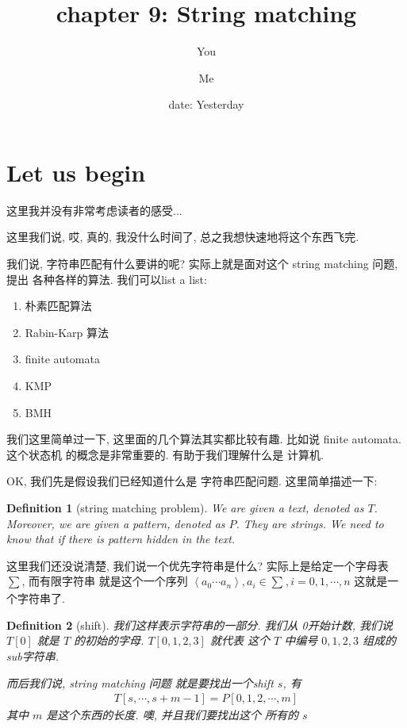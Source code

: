 \documentclass[a4paper, 10pt]{ctexart} %
\title{chapter 9: String matching}
\author{You \and Me}
\date{date: Yesterday}
\newtheorem{definition}{Definition}
\begin{document}
\maketitle
\tableofcontents
\newpage

\section{Let us begin}
这里我并没有非常考虑读者的感受...

这里我们说, 哎, 真的, 我没什么时间了, 
总之我想快速地将这个东西飞完. 

我们说, 字符串匹配有什么要讲的呢? 
实际上就是面对这个 string matching 问题, 提出
各种各样的算法.
我们可以list a list: 
\begin{enumerate}
    \item 朴素匹配算法
    \item Rabin-Karp 算法
    \item finite automata 
    \item KMP 
    \item BMH
\end{enumerate}

我们这里简单过一下, 
这里面的几个算法其实都比较有趣.
比如说 finite automata. 这个状态机
的概念是非常重要的. 有助于我们理解什么是
计算机. 

OK, 我们先是假设我们已经知道什么是
字符串匹配问题. 这里简单描述一下:
\begin{definition}[string matching problem]
We are given a text, denoted as $T$. Moreover, 
we are given a pattern, denoted as $P$. 
They are strings. We need to know that 
if there is pattern hidden in 
the text. 
\end{definition}
这里我们还没说清楚, 我们说一个优先字符串是什么? 
实际上是给定一个字母表 $\sum $, 而有限字符串
就是这个一个序列 $\left<a_{0}\cdots a_{n}\right> , a_{i} \in \sum_{}, i =0 , 1, \cdots , n$ 
这就是一个字符串了.
\begin{definition}[shift]
我们这样表示字符串的一部分. 我们从
0开始计数, 我们说 $T\left[ 0 \right]$ 
就是 $T$ 的初始的字母. $T\left[ 0 , 1, 2 ,3 \right]$ 就代表
这个 $T$ 中编号 $0 , 1, 2 , 3$ 组成的sub字符串.

而后我们说, string matching 问题
就是要找出一个shift $s$, 有 
\begin{align*}
    T[s,\cdots , s+m-1] = P[0,1,2,\cdots ,m]
\end{align*}
其中 $m$ 是这个东西的长度. 噢, 并且我们要找出这个
所有的 $s$
\end{definition}
\end{document}
